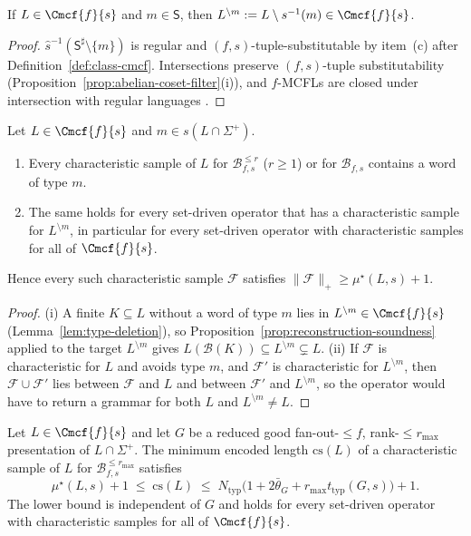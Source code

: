 \begin{lemma}
\label{lem:type-deletion}
If $L\in\Cmcf{f}{s}$ and $m\in\mathsf S$, then
$L^{\setminus m}:=L\setminus s^{-1}(m)\in\Cmcf{f}{s}$.
\end{lemma}

\begin{proof}
$\widehat s^{-1}(\mathsf S^\sharp\setminus\{m\})$ is regular and
$(f,s)$-tuple-substitutable by item~(c) after
Definition~\ref{def:class-cmcf}.  Intersections preserve
$(f,s)$-tuple substitutability
(Proposition~\ref{prop:abelian-coset-filter}(i)), and $f$-MCFLs are
closed under intersection with regular languages \cite{SekiEtAl1991}.
\end{proof}

\begin{proposition}
\label{prop:rare-type}
Let $L\in\Cmcf{f}{s}$ and $m\in s(L\cap\Sigma^+)$.
\begin{enumerate}[label=\textup{(\roman*)},leftmargin=*]
\item Every characteristic sample of $L$ for $\mathcal B^{\le r}_{f,s}$
($r\ge1$) or for $\mathcal B_{f,s}$ contains a word of type $m$.
\item The same holds for every set-driven operator that has a
characteristic sample for $L^{\setminus m}$, in particular for every
set-driven operator with characteristic samples for all of
$\Cmcf{f}{s}$.
\end{enumerate}
Hence every such characteristic sample $\mathcal F$ satisfies
$\|\mathcal F\|_+\ge\mu^\star(L,s)+1$.
\end{proposition}

\begin{proof}
(i) A finite $K\subseteq L$ without a word of type $m$ lies in
$L^{\setminus m}\in\Cmcf{f}{s}$ (Lemma~\ref{lem:type-deletion}), so
Proposition~\ref{prop:reconstruction-soundness} applied to the target
$L^{\setminus m}$ gives
$L(\mathcal B(K))\subseteq L^{\setminus m}\subsetneq L$.
(ii) If $\mathcal F$ is characteristic for $L$ and avoids type $m$, and
$\mathcal F'$ is characteristic for $L^{\setminus m}$, then
$\mathcal F\cup\mathcal F'$ lies between $\mathcal F$ and $L$ and between
$\mathcal F'$ and $L^{\setminus m}$, so the operator would have to return
a grammar for both $L$ and $L^{\setminus m}\ne L$.
\end{proof}

\begin{corollary}[Sandwich]
\label{cor:typed-sandwich}
Let $L\in\Cmcf{f}{s}$ and let $G$ be a reduced good fan-out-$\le f$,
rank-$\le r_{\max}$ presentation of $L\cap\Sigma^+$.  The minimum encoded
length $\mathrm{cs}(L)$ of a characteristic sample of $L$ for
$\mathcal B^{\le r_{\max}}_{f,s}$ satisfies
\[
 \mu^\star(L,s)+1\;\le\;\mathrm{cs}(L)\;\le\;
 N_{\mathrm{typ}}\bigl(1+2\bar\theta_G+r_{\max}t_{\mathrm{typ}}(G,s)\bigr)+1 .
\]
The lower bound is independent of $G$ and holds for every set-driven
operator with characteristic samples for all of $\Cmcf{f}{s}$.
\end{corollary}

